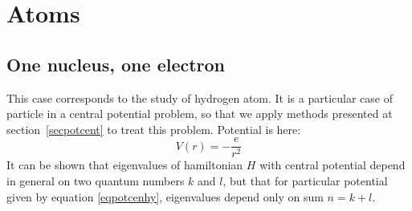 \documentclass[12pt]{book}
\begin{document}
\section{Atoms}\label{secatomemq}
\subsection{One nucleus, one electron}\label{sechydrog}
This case corresponds to the study of hydrogen atom. It is a
particular case of particle in a central potential problem, so that we apply
methods presented at section~\ref{secpotcent} to treat this
problem. Potential is here:
\begin{equation}\label{eqpotcenhy}
V(r)=-\frac{e}{r^2}
\end{equation}
It can be shown that eigenvalues of hamiltonian $H$ with central potential depend in general on two
quantum numbers $k$ and $l$, but that for particular potential given by
equation \ref{eqpotcenhy}, eigenvalues depend only on sum $n=k+l$.
\end{document}
